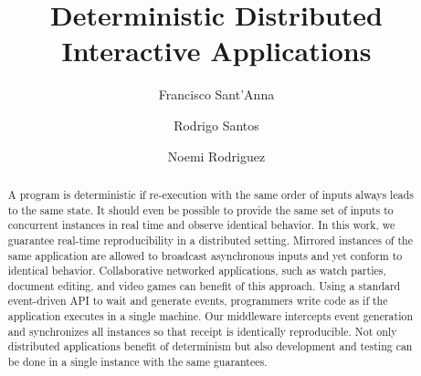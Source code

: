 \documentclass[sigplan,screen]{acmart}
\begin{document}
\title{Deterministic Distributed Interactive Applications}

\author{Francisco Sant'Anna}

\author{Rodrigo Santos}

\author{Noemi Rodriguez}


\begin{abstract}
A program is deterministic if re-execution with the same order of inputs always
leads to the same state.
It should even be possible to provide the same set of inputs to concurrent
instances in real time and observe identical behavior.
%
In this work, we guarantee real-time reproducibility in a distributed setting.
Mirrored instances of the same application are allowed to broadcast
asynchronous inputs and yet conform to identical behavior.
Collaborative networked applications, such as watch parties, document editing,
and video games can benefit of this approach.
%
Using a standard event-driven API to wait and generate events, programmers
write code as if the application executes in a single machine.
Our middleware intercepts event generation and synchronizes all instances so
that receipt is identically reproducible.
Not only distributed applications benefit of determinism but also development
and testing can be done in a single instance with the same guarantees.
\end{abstract}

\maketitle
\end{document}
